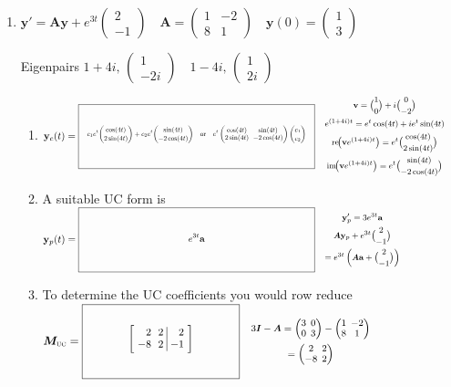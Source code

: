 \documentclass[12pt,letterpaper]{article}
\newcommand{\vect}[1]{\mathbf{#1}}
\newcommand{\mat}[1]{\bm{#1}}
\newcommand{\KeyBox}[3]{%
  \vcenter{\hbox{$\boxed{%
    \rule{0pt}{#2}\makebox[#1][c]{%
      \smash{\raisebox{\dimexpr#2/2\relax}{%
        \small\setlength{\arraycolsep}{3pt}\renewcommand{\arraystretch}{0.95}%
        $\vcenter{\hbox{$\displaystyle #3$}}$}}}}$}}}
\newcommand{\KeySide}[2]{\quad\vcenter{\hbox{\parbox{#1}{\footnotesize\setlength{\arraycolsep}{2pt}\ensuremath{\begin{gathered}#2\end{gathered}}}}}}
\begin{document}
\begin{enumerate}
\begin{enumerate}
\end{enumerate}
\newpage
\item[]
$\vect{y}'=\mat{A}\vect{y}+e^{3t}\begin{pmatrix}2\\-1\end{pmatrix}\quad
\mat{A}=\begin{pmatrix}1&-2\\8&1\end{pmatrix}\quad
\vect{y}(0)=\begin{pmatrix}1\\3\end{pmatrix}$
\par Eigenpairs $1+4i,\,\begin{pmatrix}1\\-2i\end{pmatrix}\quad
1-4i,\,\begin{pmatrix}1\\2i\end{pmatrix}$
\begin{enumerate}
\item $\vect{y}_c(t)=\KeyBox{3.2in}{0.80in}{\resizebox{3.05in}{!}{$\displaystyle c_1e^t\binom{\cos(4t)}{2\sin(4t)}+c_2e^t\binom{\sin(4t)}{-2\cos(4t)}\quad\text{or}\quad e^t\begin{pmatrix}\cos(4t)&\sin(4t)\\2\sin(4t)&-2\cos(4t)\end{pmatrix}\binom{c_1}{c_2}$}}\KeySide{2.45in}{\vect{v}=\binom{1}{0}+i\binom{0}{-2}\\e^{(1+4i)t}=e^t\cos(4t)+i e^t\sin(4t)\\\operatorname{re}\!\bigl(\vect{v}e^{(1+4i)t}\bigr)=e^t\binom{\cos(4t)}{2\sin(4t)}\\\operatorname{im}\!\bigl(\vect{v}e^{(1+4i)t}\bigr)=e^t\binom{\sin(4t)}{-2\cos(4t)}}$
\item A suitable UC form is
\newline
$\vect{y}_p(t)=\KeyBox{3.2in}{0.80in}{e^{3t}\vect{a}}\KeySide{2.45in}{\vect{y}_p'=3e^{3t}\vect{a}\\ \mat{A}\vect{y}_p+e^{3t}\binom{2}{-1}\\=e^{3t}\left(\mat{A}\vect{a}+\binom{2}{-1}\right)}$
\item To determine the UC coefficients you would row reduce
\newline
$\mat{M}_{\text{\textsc{uc}}}=\KeyBox{1.8in}{0.80in}{\left[\begin{array}{rr|r}2&2&2\\-8&2&-1\end{array}\right]}\KeySide{3in}{3\mat{I}-\mat{A}=\begin{pmatrix}3&0\\0&3\end{pmatrix}-\begin{pmatrix}1&-2\\8&1\end{pmatrix}\\=\begin{pmatrix}2&2\\-8&2\end{pmatrix}}$

\end{enumerate}
\end{enumerate}
\end{document}
